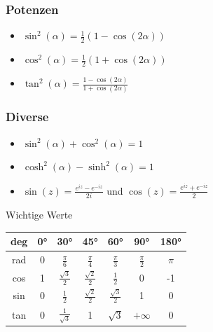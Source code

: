 \documentclass[a4paper,10pt]{article}
\begin{document}
\subsubsection{Potenzen}
\begin{itemize}
 \item $\sin^2(\alpha) = \frac{1}{2}(1-\cos(2\alpha))$
 \item $\cos^2(\alpha) = \frac{1}{2}(1+\cos(2\alpha))$
 \item $\tan^2(\alpha) = \frac{1-\cos(2\alpha)}{1+\cos(2\alpha)}$
\end{itemize}

\subsubsection{Diverse}

\begin{itemize}
 \item $\sin^2(\alpha) + \cos^2(\alpha) = 1$
 \item $\cosh^2(\alpha) - \sinh^2(\alpha) = 1$
 \item $\sin(z) = \frac{e^{iz} - e^{-iz}}{2i}$ und $\cos(z) = \frac{e^{iz} + e^{-iz}}{2}$
\end{itemize}

\begingroup
\renewcommand*{\arraystretch}{2}

\begin{subbox}{Wichtige Werte}
  \begin{center} 
    \begin{tabular}{c|cccccc}
      deg & 0° & 30° & 45° & 60° & 90° & 180° \\
      \midrule
      rad & 0 & $\frac{\pi}{6}$ & $\frac{\pi}{4}$ & $\frac{\pi}{3}$ & $\frac{\pi}{2}$ & $\pi$ \\
      cos & 1 & $\frac{\sqrt{3}}{2}$ & $\frac{\sqrt{2}}{2}$ & $\frac{1}{2}$ & 0 & -1 \\
      sin & 0 & $\frac{1}{2}$ & $\frac{\sqrt{2}}{2}$ & $\frac{\sqrt{3}}{2}$ & 1 & 0 \\
      tan & 0 & $\frac{1}{\sqrt{3}}$ & 1 & $\sqrt{3}$ & $+\infty$ & 0 \\
    \end{tabular}
  \end{center}
\end{subbox}
\end{document}
